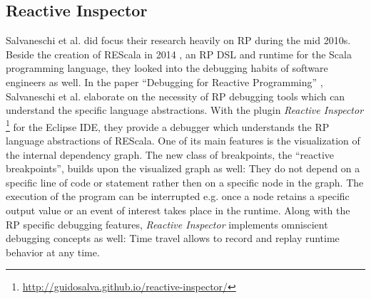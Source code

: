 \documentclass[12pt,a4paper]{article}
\begin{document}
\subsection{Reactive Inspector}

Salvaneschi et al. did focus their research heavily on RP during the mid 2010s. Beside the creation of REScala in 2014 \cite{REScala}, an RP DSL and runtime for the Scala programming language, they looked into the debugging habits of software engineers as well. In the paper ``Debugging for Reactive Programming'' \cite{positiveEffectsRP}, Salvaneschi et al. elaborate on the necessity of RP debugging tools which can understand the specific language abstractions. With the plugin \emph{Reactive Inspector} \footnote{\url{http://guidosalva.github.io/reactive-inspector/}} for the Eclipse IDE, they provide a debugger which understands the RP language abstractions of REScala. One of its main features is the visualization of the internal dependency graph. The new class of  breakpoints, the ``reactive breakpoints'', builds upon the visualized graph as well: They do not depend on a specific line of code or statement rather then on a specific node in the graph. The execution of the program can be interrupted e.g. once a node retains a specific output value or an event of interest takes place in the runtime. Along with the RP specific debugging features, \emph{Reactive Inspector} implements omniscient debugging concepts as well: Time travel allows to record and replay runtime behavior at any time.
\end{document}
